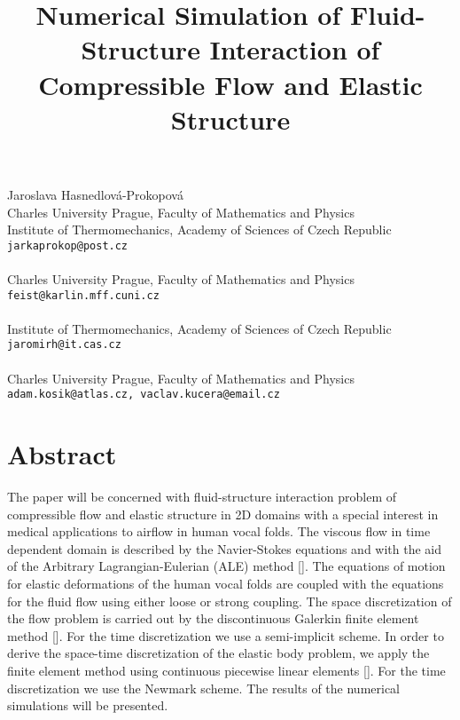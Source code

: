 \title{Numerical Simulation of Fluid-Structure Interaction of Compressible Flow and Elastic Structure}
 \author{} \institute{}
\maketitle
\begin{center}
{\large Jaroslava Hasnedlov\'{a}-Prokopov\'{a}}\\
Charles University Prague, Faculty of Mathematics and Physics\\
Institute of Thermomechanics, Academy of Sciences of Czech Republic\\
{\tt jarkaprokop@post.cz}
\\ \vspace{4mm}{\large Miloslav Feistauer}\\
Charles University Prague, Faculty of Mathematics and Physics\\
{\tt feist@karlin.mff.cuni.cz}
\\ \\
Institute of Thermomechanics, Academy of Sciences of Czech Republic\\
{\tt jaromirh@it.cas.cz}
\\ \\
Charles University Prague, Faculty of Mathematics and Physics\\
{\tt adam.kosik@atlas.cz, vaclav.kucera@email.cz}

\end{center}

\section*{Abstract}

The paper will be concerned with fluid-structure interaction problem of com\-pressible flow and elastic structure in 2D domains with a special interest in medical applications to airflow in human vocal folds. The viscous flow in time dependent domain is described by the Navier-Stokes equations and with the aid of the Arbitrary Lagrangian-Eulerian (ALE) method [\cite{nom-hug}]. The equations of motion for elastic deformations of the human vocal folds are coupled with the equations for the fluid flow using either loose or strong coupling. The space discretization of the flow problem is carried out by the discontinuous Galerkin finite element method [\cite{ces-feist-hor-kuc-prok}]. For the time discretization we use a semi-implicit scheme. In order to derive the space-time discretization of the elastic body problem, we apply the finite element method  using continuous piecewise linear elements [\cite{kos-feist-hor-svac}]. For the time discretization we use the Newmark scheme. The results of the numerical simulations will be presented.

